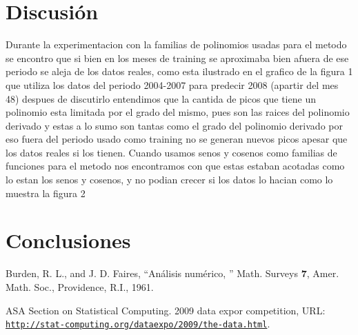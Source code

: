 \documentclass{endm}
\begin{document}
\section{Discusi\'on}
	Durante la experimentacion con la familias de polinomios usadas para el metodo se encontro que si bien en los meses de training se aproximaba bien afuera de ese periodo se aleja de los datos reales, como esta ilustrado en el grafico de la figura 1 que utiliza los datos del periodo 2004-2007 para predecir 2008 (apartir del mes 48) despues de discutirlo entendimos que la cantida de picos que tiene un polinomio esta limitada por el grado del mismo, pues son las raices del polinomio derivado y estas a lo sumo son tantas como el grado del polinomio derivado por eso fuera del periodo usado como training no se generan nuevos picos apesar que los datos reales si los tienen. Cuando usamos senos y cosenos como familias de funciones para el metodo nos encontramos con que estas estaban acotadas como lo estan los senos y cosenos, y no podian crecer si los datos lo hacian como lo muestra la figura 2





\section{Conclusiones}




\begin{thebibliography}{10}\label{bibliography}
  
 Burden, R. L., and J. D. Faires, ``An\'alisis num\'erico,
'' Math. Surveys \textbf{7}, Amer. Math. Soc.,
  Providence, R.I., 1961.
  
 ASA Section on Statistical Computing. 2009 data expor competition, URL:
  \href{http://stat-computing.org/dataexpo/2009/the-data.html}
  {\texttt{http://stat-computing.org/dataexpo/2009/the-data.html}}.

\end{thebibliography}
\end{document}
